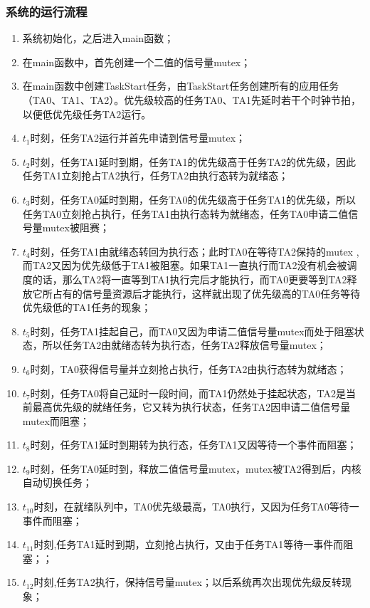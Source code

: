 \documentclass{ctexart}
\begin{document}
    \subsubsection{系统的运行流程}
    
    \begin{enumerate}
        \item 系统初始化，之后进入main函数；
        \item 在main函数中，首先创建一个二值的信号量mutex；
        \item  在main函数中创建TaskStart任务，由TaskStart任务创建所有的应用任务（TA0、TA1、TA2）。优先级较高的任务TA0、TA1先延时若干个时钟节拍，以便低优先级任务TA2运行。
        \item $t_1$时刻，任务TA2运行并首先申请到信号量mutex；
        \item $t_2$时刻，任务TA1延时到期，任务TA1的优先级高于任务TA2的优先级，因此任务TA1立刻抢占TA2执行，任务TA2由执行态转为就绪态；
        \item $t_3$时刻，任务TA0延时到期，任务TA0的优先级高于任务TA1的优先级，所以任务TA0立刻抢占执行，任务TA1由执行态转为就绪态，任务TA0申请二值信号量mutex被阻赛；
        \item $t_4$时刻，任务TA1由就绪态转回为执行态；此时TA0在等待TA2保持的mutex , 而TA2又因为优先级低于TA1被阻塞。如果TA1一直执行而TA2没有机会被调度的话，那么TA2将一直等到TA1执行完后才能执行，而TA0更要等到TA2释放它所占有的信号量资源后才能执行，这样就出现了优先级高的TA0任务等待优先级低的TA1任务的现象；
        \item $t_5$时刻，任务TA1挂起自己，而TA0又因为申请二值信号量mutex而处于阻塞状态，所以任务TA2由就绪态转为执行态，任务TA2释放信号量mutex；
        \item $t_6$时刻，TA0获得信号量并立刻抢占执行，任务TA2由执行态转为就绪态；
        \item $t_7$时刻，任务TA0将自己延时一段时间，而TA1仍然处于挂起状态，TA2是当前最高优先级的就绪任务，它又转为执行状态，任务TA2因申请二值信号量mutex而阻塞；
        \item $t_8$时刻，任务TA1延时到期转为执行态，任务TA1又因等待一个事件而阻塞；
        \item $t_9$时刻，任务TA0延时到，释放二值信号量mutex，mutex被TA2得到后，内核自动切换任务；
        \item $t_{10}$时刻，在就绪队列中，TA0优先级最高，TA0执行，又因为任务TA0等待一事件而阻塞；
        \item $t_{11}$时刻,任务TA1延时到期，立刻抢占执行，又由于任务TA1等待一事件而阻塞；；
        \item $t_{12}$时刻,任务TA2执行，保持信号量mutex；以后系统再次出现优先级反转现象；
    \end{enumerate}
\end{document}
